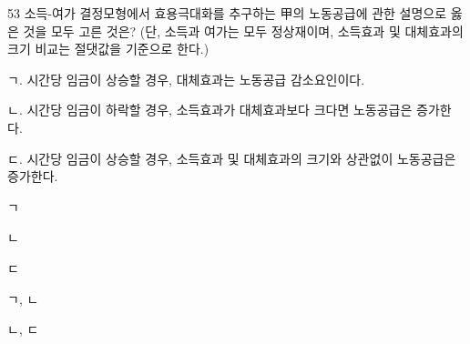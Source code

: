 \begin{question}{53}
소득-여가 결정모형에서 효용극대화를 추구하는 甲의 노동공급에 관한 설명으로 옳은 것을 모두 고른 것은? (단, 소득과 여가는 모두 정상재이며, 소득효과 및 대체효과의 크기 비교는 절댓값을 기준으로 한다.)
\begin{framedtext}
ㄱ. 시간당 임금이 상승할 경우, 대체효과는 노동공급 감소요인이다. \par
ㄴ. 시간당 임금이 하락할 경우, 소득효과가 대체효과보다 크다면 노동공급은 증가한다. \par
ㄷ. 시간당 임금이 상승할 경우, 소득효과 및 대체효과의 크기와 상관없이 노동공급은 증가한다. \par
\end{framedtext}
\begin{choices}
  \item ㄱ
  \item ㄴ
  \item ㄷ
  \item ㄱ, ㄴ
  \item ㄴ, ㄷ
\end{choices}
\end{question}
